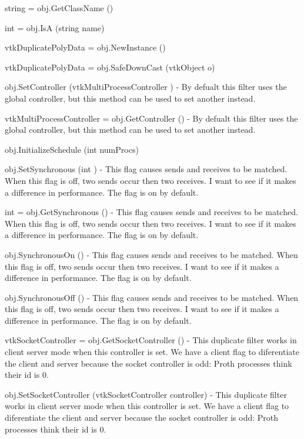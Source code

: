 \begin{DoxyItemize}
\item {\ttfamily string = obj.\-Get\-Class\-Name ()}  
\item {\ttfamily int = obj.\-Is\-A (string name)}  
\item {\ttfamily vtk\-Duplicate\-Poly\-Data = obj.\-New\-Instance ()}  
\item {\ttfamily vtk\-Duplicate\-Poly\-Data = obj.\-Safe\-Down\-Cast (vtk\-Object o)}  
\item {\ttfamily obj.\-Set\-Controller (vtk\-Multi\-Process\-Controller )} -\/ By defualt this filter uses the global controller, but this method can be used to set another instead.  
\item {\ttfamily vtk\-Multi\-Process\-Controller = obj.\-Get\-Controller ()} -\/ By defualt this filter uses the global controller, but this method can be used to set another instead.  
\item {\ttfamily obj.\-Initialize\-Schedule (int num\-Procs)}  
\item {\ttfamily obj.\-Set\-Synchronous (int )} -\/ This flag causes sends and receives to be matched. When this flag is off, two sends occur then two receives. I want to see if it makes a difference in performance. The flag is on by default.  
\item {\ttfamily int = obj.\-Get\-Synchronous ()} -\/ This flag causes sends and receives to be matched. When this flag is off, two sends occur then two receives. I want to see if it makes a difference in performance. The flag is on by default.  
\item {\ttfamily obj.\-Synchronous\-On ()} -\/ This flag causes sends and receives to be matched. When this flag is off, two sends occur then two receives. I want to see if it makes a difference in performance. The flag is on by default.  
\item {\ttfamily obj.\-Synchronous\-Off ()} -\/ This flag causes sends and receives to be matched. When this flag is off, two sends occur then two receives. I want to see if it makes a difference in performance. The flag is on by default.  
\item {\ttfamily vtk\-Socket\-Controller = obj.\-Get\-Socket\-Controller ()} -\/ This duplicate filter works in client server mode when this controller is set. We have a client flag to diferentiate the client and server because the socket controller is odd\-: Proth processes think their id is 0.  
\item {\ttfamily obj.\-Set\-Socket\-Controller (vtk\-Socket\-Controller controller)} -\/ This duplicate filter works in client server mode when this controller is set. We have a client flag to diferentiate the client and server because the socket controller is odd\-: Proth processes think their id is 0.  

\end{DoxyItemize}
